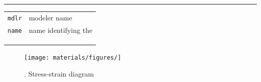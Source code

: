 \subsection{}
\noindent 
\begin{verbatim}

\end{verbatim}
\vspace{-10pt}
{\color{grayLines} \rule{\linewidth}{0.25pt}}
\begin{center}
\begin{tabular}{lp{10cm}}
{\tt mdlr} & modeler name \\
{\tt name} & name identifying the \\
{\tt } &  \\
{\tt } &  \\
{\tt } &  \\
\end{tabular}
\end{center}

\begin{figure}[h]
\centering
\texttt{[image: materials/figures/]}
\caption{. Stress-strain diagram}\label{}
\end{figure}
